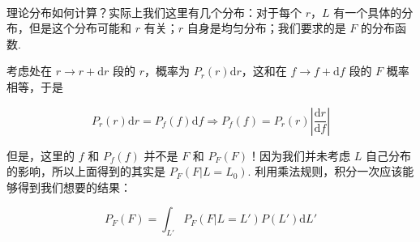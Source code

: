\documentclass[11pt]{article}
\begin{document}
    \begin{center}
    \end{center}
    { \hspace*{\fill} \\}
    
    理论分布如何计算？实际上我们这里有几个分布：对于每个 \(r\)，\(L\)
有一个具体的分布，但是这个分布可能和 \(r\) 有关；\(r\)
自身是均匀分布；我们要求的是 \(F\) 的分布函数.

考虑处在 \(r\to r+\text{d}r\) 段的 \(r\)，概率为
\(P_r(r)\text{d}r\)，这和在 \(f\to f+\text{d}f\) 段的 \(F\)
概率相等，于是

\[
P_r(r)\text{d}r = P_f(f)\text{d}f \Longrightarrow P_f(f) = P_r(r)\left|\frac{\text{d}r}{\text{d}f}\right|
\]

但是，这里的 \(f\) 和 \(P_f(f)\) 并不是 \(F\) 和
\(P_F(F)\)！因为我们并未考虑 \(L\) 自己分布的影响，所以上面得到的其实是
\(P_F(F|L = L_0)\). 利用乘法规则，积分一次应该能够得到我们想要的结果：

\[
P_F(F) = \int_{L'} P_F(F|L = L')P(L')\text{d}L'
\]
\end{document}
